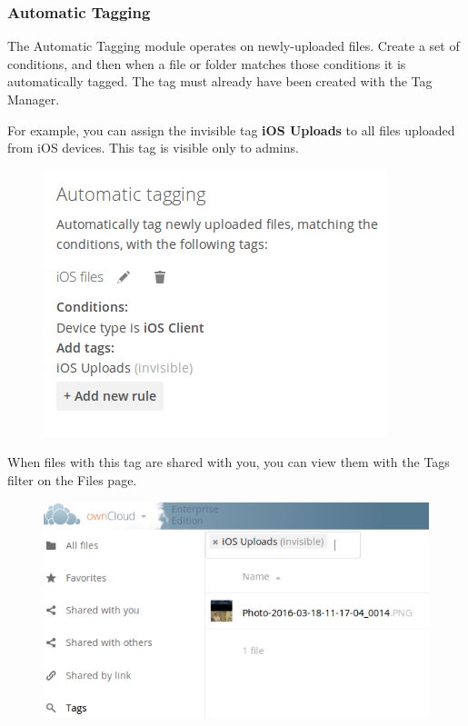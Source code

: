 \documentclass[letterpaper,10pt,english]{sphinxmanual}
\begin{document}
\subsubsection{Automatic Tagging}
\label{enterprise_file_management/files_tagging:automatic-tagging}
The Automatic Tagging module operates on newly-uploaded files. Create a set of
conditions, and then when a file or folder matches those conditions it is
automatically tagged. The tag must already have been created with the Tag
Manager.

For example, you can assign the invisible tag \textbf{iOS Uploads} to all files
uploaded from iOS devices. This tag is visible only to admins.
\begin{figure}[htbp]
\centering

\includegraphics{workflow-2.png}
\end{figure}

When files with this tag are shared with you, you can view them with the Tags
filter on the Files page.
\begin{figure}[htbp]
\centering

\includegraphics{workflow-3.png}
\end{figure}
\end{document}
